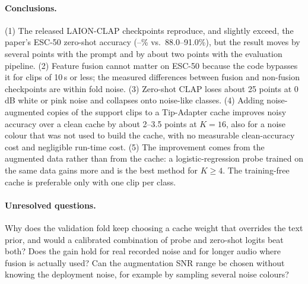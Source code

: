 \paragraph{Conclusions.}
(1) The released LAION-CLAP checkpoints reproduce, and slightly exceed, the paper's ESC-50 zero-shot accuracy (\repaudiosetfusionA--\repaudiosetA\% vs.\ 88.0--91.0\%), but the result moves by several points with the prompt and by about two points with the evaluation pipeline.
(2) Feature fusion cannot matter on ESC-50 because the code bypasses it for clips of 10\,s or less; the measured differences between fusion and non-fusion checkpoints are within fold noise.
(3) Zero-shot CLAP loses about 25 points at 0\,dB white or pink noise and collapses onto noise-like classes.
(4) Adding noise-augmented copies of the support clips to a Tip-Adapter cache improves noisy accuracy over a clean cache by about 2--3.5 points at $K{=}16$, also for a noise colour that was not used to build the cache, with no measurable clean-accuracy cost and negligible run-time cost.
(5) The improvement comes from the augmented data rather than from the cache: a logistic-regression probe trained on the same data gains more and is the best method for $K\ge4$. The training-free cache is preferable only with one clip per class.

\paragraph{Unresolved questions.}
Why does the validation fold keep choosing a cache weight that overrides the text prior, and would a calibrated combination of probe and zero-shot logits beat both?
Does the gain hold for real recorded noise and for longer audio where fusion is actually used?
Can the augmentation SNR range be chosen without knowing the deployment noise, for example by sampling several noise colours?
